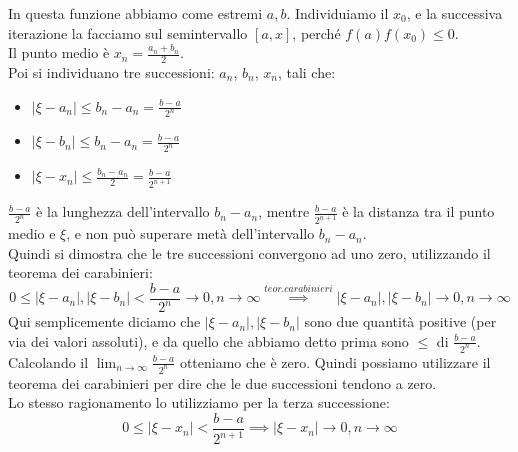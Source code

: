 In questa funzione abbiamo come estremi $a, b$. Individuiamo il  $x_0$, e la successiva iterazione la facciamo sul semintervallo $[a,x]$, perché $f(a) f(x_0)\leq 0$.\\
Il punto medio è $x_n=\frac{a_n+b_n}{2}$.\\
Poi si individuano tre successioni: ${a_n}$, ${b_n}$, ${x_n}$, tali che:
\begin{itemize}
    \item $|\xi-a_n|\leq b_n-a_n = \frac{b-a}{2^n}$
    \item $|\xi-b_n|\leq b_n-a_n = \frac{b-a}{2^n}$
    \item $|\xi-x_n|\leq \frac{b_n-a_n}{2} = \frac{b-a}{2^{n+1}}$
\end{itemize}
$\frac{b-a}{2^n}$ è la lunghezza dell'intervallo $b_n-a_n$, mentre $\frac{b-a}{2^{n+1}}$ è la distanza tra il punto medio e $\xi$, e non può superare metà dell'intervallo $b_n-a_n$.\\
Quindi si dimostra che le tre successioni convergono ad uno zero, utilizzando il teorema dei carabinieri:\\
\begin{displaymath}
    0 \leq |\xi-a_n|, |\xi-b_n| < \frac{b-a}{2^n}\to 0, n \to \infty \overset{teor. carabinieri}{\implies} |\xi-a_n|, |\xi-b_n| \to 0, n \to \infty
\end{displaymath}
Qui semplicemente diciamo che $|\xi-a_n|, |\xi-b_n|$ sono due quantità positive (per via dei valori assoluti), e da quello che abbiamo detto prima sono $\leq$ di $ \frac{b-a}{2^n}$.\\
Calcolando il $\lim_{n\to \infty} \frac{b-a}{2^n}$ otteniamo che è zero. Quindi possiamo utilizzare il teorema dei carabinieri per dire che le due successioni tendono a zero.\\
Lo stesso ragionamento lo utilizziamo per la terza successione:
\begin{displaymath}
    0 \leq |\xi-x_n|< \frac{b-a}{2^{n+1}}\implies |\xi-x_n| \to 0, n\to \infty
\end{displaymath}

